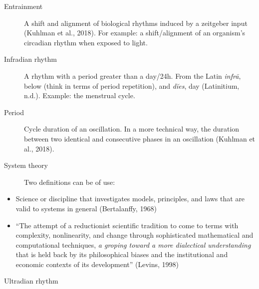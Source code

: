 \documentclass[
  12pt,
  a4paper,
  oneside]{tesesusp}
\providecommand{\tightlist}{%
  \setlength{\itemsep}{0pt}\setlength{\parskip}{0pt}}\usepackage{longtable,booktabs,array}
\begin{document}
\begin{termos}
\begin{description}
\item[Entrainment]
\hspace{20cm}

A shift and alignment of biological rhythms induced by a zeitgeber input
(Kuhlman et al., 2018). For example: a shift/alignment of an organism's
circadian rhythm when exposed to light.
\end{description}

\begin{description}
\item[Infradian rhythm]
\hspace{20cm}

A rhythm with a period greater than a day/24h. From the Latin
\emph{infrā}, below (think in terms of period repetition), and
\emph{dĭes}, day (Latinitium, n.d.). Example: the menstrual cycle.
\end{description}

\begin{description}
\item[Period]
\hspace{20cm}

Cycle duration of an oscillation. In a more technical way, the duration
between two identical and consecutive phases in an oscillation (Kuhlman
et al., 2018).
\end{description}

\begin{description}
\item[System theory]
\hspace{20cm}

Two definitions can be of use:
\end{description}

\begin{itemize}
\tightlist
\item
  Science or discipline that investigates models, principles, and laws
  that are valid to systems in general (Bertalanffy, 1968)
\item
  ``The attempt of a reductionist scientific tradition to come to terms
  with complexity, nonlinearity, and change through sophisticated
  mathematical and computational techniques, \emph{a groping toward a
  more dialectical understanding} that is held back by its philosophical
  biases and the institutional and economic contexts of its
  development'' (Levins, 1998)
\end{itemize}

\begin{description}
\item[Ultradian rhythm]
\hspace{20cm}


\end{description}
\end{termos}
\end{document}
